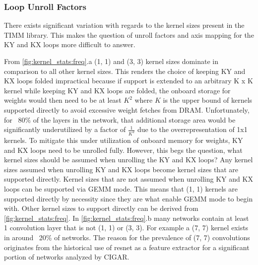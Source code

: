 
\subsubsection{Loop Unroll Factors}
\label{chap:dda:dataflow_dse:pruning:applying_it:loop_unroll_factors}

There exists significant variation with regards to the kernel sizes present in
the TIMM library. This makes the question of unroll factors and axis mapping for
the KY and KX loops more difficult to answer.

From \autoref{fig:kernel_stats:freq}.a (1, 1) and (3, 3) kernel sizes dominate in
comparison to all other kernel sizes. This renders the choice of keeping KY and
KX loops folded impractical because if support is extended to an arbitrary K x K
kernel while keeping KY and KX loops are folded, the onboard storage for weights would
then need to be at least $K^2$ where $K$ is the upper bound of kernels supported
directly to avoid excessive weight fetches from DRAM. Unfortunately, for ~80\% of
the layers in the network, that additional storage area would be significantly
underutilized by a factor of $\frac{1}{K^2}$ due to the overrepresentation of
1x1 kernels. To mitigate this under utilization of onboard memory for weights, KY
and KX loops need to be unrolled fully. However, this begs the question, what
kernel sizes should be assumed when unrolling the KY and KX loops? Any kernel
sizes assumed when unrolling KY and KX loops become kernel sizes that are
supported directly. Kernel sizes that are not assumed when unrolling KY and KX
loops can be supported via GEMM mode. This means that (1, 1)
kernels are supported directly by necessity since they are what enable GEMM mode
to begin with. Other kernel sizes to support directly can be derived from
\autoref{fig:kernel_stats:freq}. In \autoref{fig:kernel_stats:freq}.b many
networks contain at least 1 convolution layer that is not (1, 1) or (3, 3). For
example a (7, 7) kernel exists in around ~20\% of networks. The reason for the
prevalence of (7, 7) convolutions originates from the historical use of resnet
\cite{resnet} as a feature extractor for a significant portion of networks
analyzed by CIGAR.

